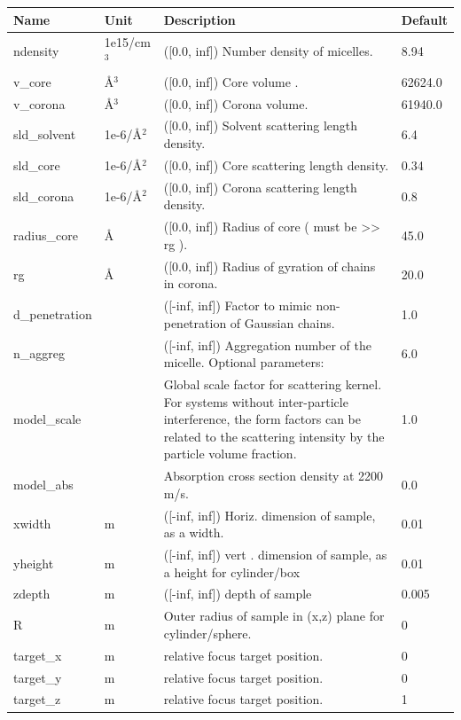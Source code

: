 \begin{longtable}{p{}p{}p{}p{}}
\toprule
\textbf{Name} & \textbf{Unit} & \textbf{Description} & \textbf{Default} \\
\midrule
\endhead
ndensity & 1e15/cm$^{3}$ & ([0.0, inf]) Number density of micelles. & 8.94 \\
v\_core & \AA{}$^{3}$ & ([0.0, inf]) Core volume . & 62624.0 \\
v\_corona & \AA{}$^{3}$ & ([0.0, inf]) Corona volume. & 61940.0 \\
sld\_solvent & 1e-6/\AA{}$^{2}$ & ([0.0, inf]) Solvent scattering length density. & 6.4 \\
sld\_core & 1e-6/\AA{}$^{2}$ & ([0.0, inf]) Core scattering length density. & 0.34 \\
sld\_corona & 1e-6/\AA{}$^{2}$ & ([0.0, inf]) Corona scattering length density. & 0.8 \\
radius\_core & \AA{} & ([0.0, inf]) Radius of core ( must be \textgreater{}\textgreater{} rg ). & 45.0 \\
rg & \AA{} & ([0.0, inf]) Radius of gyration of chains in corona. & 20.0 \\
d\_penetration &  & ([-inf, inf]) Factor to mimic non-penetration of Gaussian chains. & 1.0 \\
n\_aggreg &  & ([-inf, inf]) Aggregation number of the micelle. Optional parameters: & 6.0 \\
model\_scale &   & Global scale factor for scattering kernel. For systems without inter-particle interference, the form factors can be related to the scattering intensity by the particle volume fraction. & 1.0 \\
model\_abs &   & Absorption cross section density at 2200 m/s. & 0.0 \\
xwidth & m & ([-inf, inf]) Horiz. dimension of sample, as a width. & 0.01 \\
yheight & m & ([-inf, inf]) vert . dimension of sample, as a height for cylinder/box & 0.01 \\
zdepth & m & ([-inf, inf]) depth of sample & 0.005 \\
R & m & Outer radius of sample in (x,z) plane for cylinder/sphere. & 0 \\
target\_x & m & relative focus target position. & 0 \\
target\_y & m & relative focus target position. & 0 \\
target\_z & m & relative focus target position. & 1 \\

\end{longtable}
